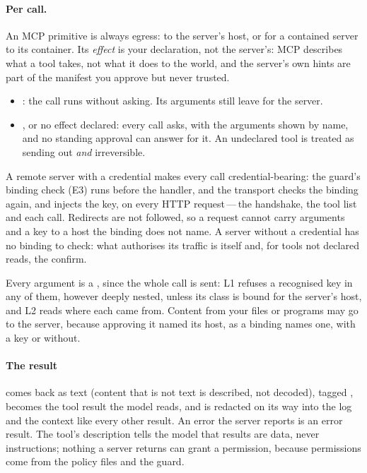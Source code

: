 \paragraph{Per call.} An MCP primitive is always egress: to the server's
host, or for a contained server to its container.
Its \emph{effect} is your declaration, not the server's: MCP describes what
a tool takes, not what it does to the world, and the server's own hints are
part of the manifest you approve but never trusted.
\begin{itemize}
\item {}: the call runs without asking. Its arguments
  still leave for the server.
\item {}, or no effect declared: every call asks, with
  the arguments shown by name, and no standing approval can answer for it.
  An undeclared tool is treated as sending out \emph{and} irreversible.
\end{itemize}
A remote server with a credential makes every call credential-bearing: the guard's
binding check (E3) runs before the handler, and the transport checks the
binding again, and injects the key, on every HTTP request\,---\,the
handshake, the tool list and each call. Redirects are not followed, so a
request cannot carry arguments and a key to a host the binding does not
name. A server without a credential has no binding to check: what
authorises its traffic is  itself and, for tools not
declared reads, the confirm.

Every argument is a , since the whole call is sent: L1 refuses
a recognised key in any of them, however deeply nested, unless its class is
bound for the server's host, and L2 reads where each came from. Content from
your files or programs may go to the server, because approving it named its
host, as a binding names one, with a key or without.

\paragraph{The result} comes back as text (content that is not text is
described, not decoded), tagged , becomes the tool result
the model reads, and is redacted on its way into the log and the context
like every other result.
An error the server reports is an error result. The tool's description
tells the model that results are data, never instructions; nothing a
server returns can grant a permission, because permissions come from the
policy files and the guard.

